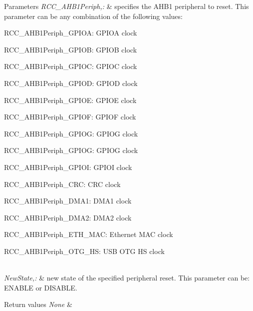 \begin{DoxyParams}{Parameters}
{\em R\-C\-C\-\_\-\-A\-H\-B1\-Periph,\-:} & specifies the A\-H\-B1 peripheral to reset. This parameter can be any combination of the following values\-: \begin{DoxyItemize}
\item R\-C\-C\-\_\-\-A\-H\-B1\-Periph\-\_\-\-G\-P\-I\-O\-A\-: G\-P\-I\-O\-A clock \item R\-C\-C\-\_\-\-A\-H\-B1\-Periph\-\_\-\-G\-P\-I\-O\-B\-: G\-P\-I\-O\-B clock \item R\-C\-C\-\_\-\-A\-H\-B1\-Periph\-\_\-\-G\-P\-I\-O\-C\-: G\-P\-I\-O\-C clock \item R\-C\-C\-\_\-\-A\-H\-B1\-Periph\-\_\-\-G\-P\-I\-O\-D\-: G\-P\-I\-O\-D clock \item R\-C\-C\-\_\-\-A\-H\-B1\-Periph\-\_\-\-G\-P\-I\-O\-E\-: G\-P\-I\-O\-E clock \item R\-C\-C\-\_\-\-A\-H\-B1\-Periph\-\_\-\-G\-P\-I\-O\-F\-: G\-P\-I\-O\-F clock \item R\-C\-C\-\_\-\-A\-H\-B1\-Periph\-\_\-\-G\-P\-I\-O\-G\-: G\-P\-I\-O\-G clock \item R\-C\-C\-\_\-\-A\-H\-B1\-Periph\-\_\-\-G\-P\-I\-O\-G\-: G\-P\-I\-O\-G clock \item R\-C\-C\-\_\-\-A\-H\-B1\-Periph\-\_\-\-G\-P\-I\-O\-I\-: G\-P\-I\-O\-I clock \item R\-C\-C\-\_\-\-A\-H\-B1\-Periph\-\_\-\-C\-R\-C\-: C\-R\-C clock \item R\-C\-C\-\_\-\-A\-H\-B1\-Periph\-\_\-\-D\-M\-A1\-: D\-M\-A1 clock \item R\-C\-C\-\_\-\-A\-H\-B1\-Periph\-\_\-\-D\-M\-A2\-: D\-M\-A2 clock \item R\-C\-C\-\_\-\-A\-H\-B1\-Periph\-\_\-\-E\-T\-H\-\_\-\-M\-A\-C\-: Ethernet M\-A\-C clock \item R\-C\-C\-\_\-\-A\-H\-B1\-Periph\-\_\-\-O\-T\-G\-\_\-\-H\-S\-: U\-S\-B O\-T\-G H\-S clock\end{DoxyItemize}
\\
\hline
{\em New\-State,\-:} & new state of the specified peripheral reset. This parameter can be\-: E\-N\-A\-B\-L\-E or D\-I\-S\-A\-B\-L\-E. \\
\hline
\end{DoxyParams}

\begin{DoxyRetVals}{Return values}
{\em None} & \\
\hline
\end{DoxyRetVals}



